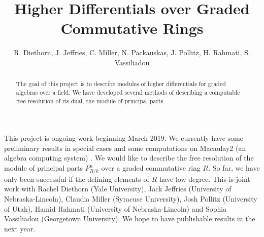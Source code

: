 \documentclass{amsart}
\theoremstyle{definition}
\theoremstyle{remark}
\numberwithin{equation}{section}
\begin{document}
\title{Higher Differentials over Graded Commutative Rings}
\author{R. Diethorn, J. Jeffries, C. Miller, N. Packauskas, J. Pollitz, H. Rahmati, S. Vassiliadou }


\begin{abstract}
	The goal of this project is to describe modules of higher differentials for graded algebras over a field.  We have developed several methods of describing a computable free resolution of its dual, the module of principal parts. 
\end{abstract}


\maketitle

This project is ongoing work beginning March 2019. We currently have some preliminary results in special cases and some computations on Macaulay2 (an algebra computing system) . We would like to describe the free resolution of the module of principal parts $P^n_{R/k}$ over a graded commutative ring $R$.  So far, we have only been successful if the defining elements of $R$ have low degree.  This is joint work with Rachel Diethorn (Yale University), Jack Jeffries (University of Nebraska-Lincoln), Claudia Miller (Syracuse University), Josh Pollitz (University of Utah), Hamid Rahmati (University of Nebraska-Lincoln) and Sophia Vassiliadou (Georgetown University). We hope to have publishable results in the next year. 
\end{document}
